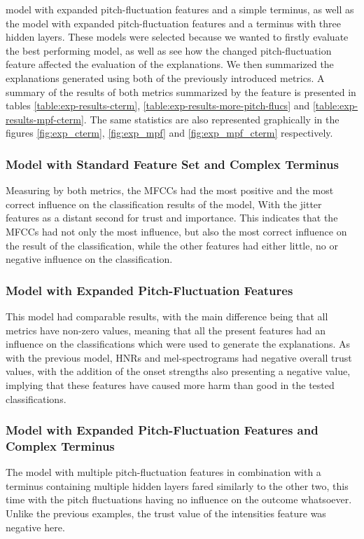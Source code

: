 \documentclass{article}
\begin{document}
		model with expanded pitch-fluctuation features and a simple terminus, as well as the model
		with expanded pitch-fluctuation features and a terminus with three hidden layers. These
		models were selected because we wanted to firstly evaluate the best performing model, as
		well as see how the changed pitch-fluctuation feature affected the evaluation of the
		explanations. We then summarized the explanations generated using both of the previously
		introduced metrics. A summary of the results of both metrics summarized by the feature is
		presented in tables \ref{table:exp-results-cterm}, \ref{table:exp-results-more-pitch-flucs}
		and \ref{table:exp-results-mpf-cterm}. The same statistics are also represented graphically
		in the figures \ref{fig:exp_cterm}, \ref{fig:exp_mpf} and \ref{fig:exp_mpf_cterm}
		respectively.
		\subsubsection{Model with Standard Feature Set and Complex Terminus}
		Measuring by both metrics, the MFCCs had the most positive and the most correct influence
		on the classification results of the model, With the jitter features as a distant second
		for trust and importance. This indicates that the MFCCs had not only the most influence,
		but also the most correct influence on the result of the classification, while the other
		features had either little, no or negative influence on the classification.
		\subsubsection{Model with Expanded Pitch-Fluctuation Features}
		This model had comparable results, with the main difference being that all metrics have
		non-zero values, meaning that all the present features had an influence on the
		classifications which were used to generate the explanations. As with the previous model,
		HNRs and mel-spectrograms had negative overall trust values, with the addition of the
		onset strengths also presenting a negative value, implying that these features have caused
		more harm than good in the tested classifications.
		\subsubsection{Model with Expanded Pitch-Fluctuation Features and Complex Terminus}
		The model with multiple pitch-fluctuation features in combination with a terminus
		containing multiple hidden layers fared similarly to the other two, this time with the
		pitch fluctuations having no influence on the outcome whatsoever. Unlike the previous
		examples, the trust value of the intensities feature was negative here.
\end{document}
